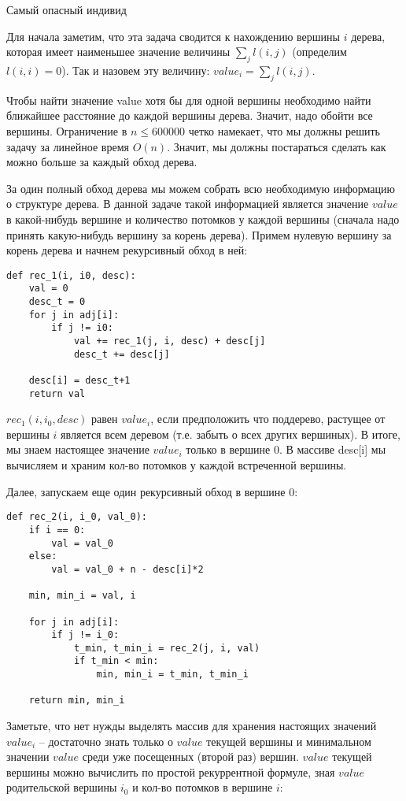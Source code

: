 \begin{tutorial}{Самый опасный индивид}

Для начала заметим, что эта задача сводится к нахождению вершины $i$ дерева, которая имеет наименьшее значение величины $ \sum_j l(i,j) $ (определим $l(i,i)=0$). Так и назовем эту величину: $ value_i = \sum_j l(i,j) $.

Чтобы найти значение value хотя бы для одной вершины необходимо найти ближайшее расстояние до каждой вершины дерева. Значит, надо обойти все вершины. Ограничение в $n\leq 600 000$ четко намекает, что мы должны решить задачу за линейное время $O(n)$. Значит, мы должны постараться сделать как можно больше за каждый обход дерева.

За один полный обход дерева мы можем собрать всю необходимую информацию о структуре дерева. В данной задаче такой информацией является значение $value$ в какой-нибудь вершине и количество потомков у каждой вершины (сначала надо принять какую-нибудь вершину за корень дерева). Примем нулевую вершину за корень дерева и начнем рекурсивный обход в ней:

\begin{verbatim}
def rec_1(i, i0, desc):
    val = 0
    desc_t = 0
    for j in adj[i]:
        if j != i0:
            val += rec_1(j, i, desc) + desc[j]
            desc_t += desc[j]

    desc[i] = desc_t+1
    return val  
\end{verbatim}

$rec_1 (i, i_0, desc) $ равен $value_i$, если предположить что поддерево, растущее от вершины $i$ является всем деревом (т.е. забыть о всех других вершиных). В итоге, мы знаем настоящее значение $value_i$ только в вершине 0. В массиве desc[i] мы вычисляем и храним кол-во потомков у каждой встреченной вершины. 

Далее, запускаем еще один рекурсивный обход в вершине 0:

\begin{verbatim}
def rec_2(i, i_0, val_0):
    if i == 0:
        val = val_0
    else:
        val = val_0 + n - desc[i]*2

    min, min_i = val, i

    for j in adj[i]:
        if j != i_0:
            t_min, t_min_i = rec_2(j, i, val)
            if t_min < min:
                min, min_i = t_min, t_min_i

    return min, min_i 
\end{verbatim}

Заметьте, что нет нужды выделять массив для хранения настоящих значений $value_i$ -- достаточно знать только о $value$ текущей вершины и минимальном значении $value$ среди уже посещенных (второй раз) вершин. $value$ текущей вершины можно вычислить по простой рекуррентной формуле, зная $value$ родительской вершины $i_0$ и кол-во потомков в вершине $i$:


\end{tutorial}
